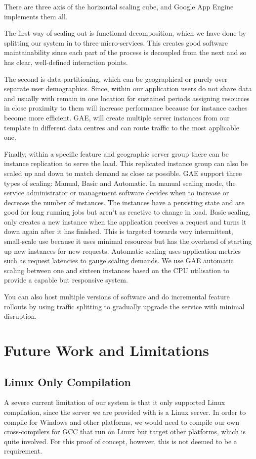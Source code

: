 \documentclass[conference]{IEEEtran}
\begin{document}
There are three axis of the horizontal scaling cube, and Google App Engine
implements them all.

The first way of scaling out is functional decomposition, which we have done by
splitting our system in to three micro-services. This creates good software
maintainability since each part of the process is decoupled from the next and
so has clear, well-defined interaction points.

The second is data-partitioning, which can be geographical or purely over
separate user demographics. Since, within our application users do not share
data and usually with remain in one location for sustained periods assigning
resources in close proximity to them will increase performance because for
instance caches become more efficient. GAE, will create multiple server
instances from our template in different data centres and can route traffic to
the most applicable one.

Finally, within a specific feature and geographic server group there can be
instance replication to serve the load. This replicated instance group can also
be scaled up and down to match demand as close as possible. GAE support three
types of scaling: Manual, Basic and Automatic. In manual scaling mode, the
service administrator or management software decides when to increase or
decrease the number of instances. The instances have a persisting state and are
good for long running jobs but aren't as reactive to change in load. Basic
scaling, only creates a new instance when the application receives a request and
turns it down again after it has finished. This is targeted towards very
intermittent, small-scale use because it uses minimal resources but has the
overhead of starting up new instances for new requests. Automatic scaling uses
application metrics such as request latencies to gauge scaling demands. We use
GAE automatic scaling between one and sixteen instances based on the CPU
utilisation to provide a capable but responsive system.

You can also host multiple versions of software and do incremental feature
rollouts by using traffic splitting to gradually upgrade the service with
minimal disruption.

\section{Future Work and Limitations}
\subsection{Linux Only Compilation}
A severe current limitation of our system is that it only supported Linux
compilation, since the server we are provided with is a Linux server. In order
to compile for Windows and other platforms, we would need to compile our own
cross-compilers for GCC that run on Linux but target other platforms, which is
quite involved. For this proof of concept, however, this is not deemed to be a
requirement.
\end{document}
